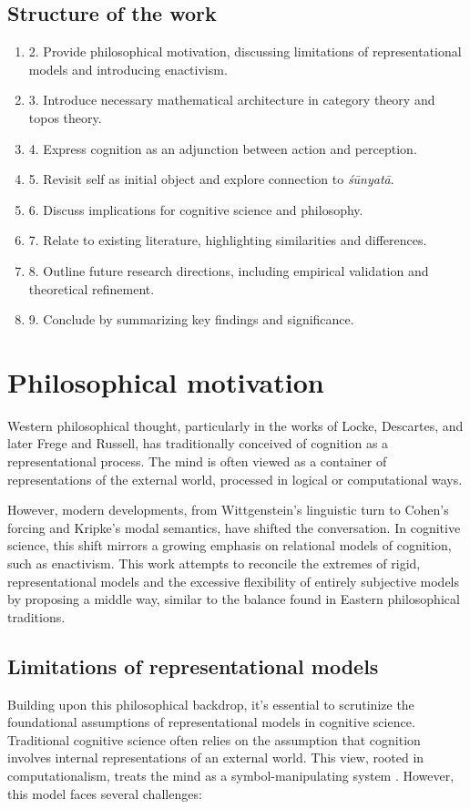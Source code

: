 \documentclass{article}
\begin{document}
\subsection{Structure of the work}
\begin{enumerate}[start=2,label=\S]
    \item 2. Provide philosophical motivation, discussing limitations of representational models and introducing enactivism.
    \item 3. Introduce necessary mathematical architecture in category theory and topos theory.
    \item 4. Express cognition as an adjunction between action and perception.
    \item 5. Revisit self as initial object and explore connection to \emph{śūnyatā}.
    \item 6. Discuss implications for cognitive science and philosophy.
    \item 7. Relate to existing literature, highlighting similarities and differences.
    \item 8. Outline future research directions, including empirical validation and theoretical refinement.
    \item 9. Conclude by summarizing key findings and significance.
\end{enumerate}

\section{Philosophical motivation}
Western philosophical thought, particularly in the works of Locke, Descartes, and later Frege and Russell, has traditionally conceived of cognition as a representational process. The mind is often viewed as a container of representations of the external world, processed in logical or computational ways.

However, modern developments, from Wittgenstein’s linguistic turn to Cohen’s forcing and Kripke’s modal semantics, have shifted the conversation. In cognitive science, this shift mirrors a growing emphasis on relational models of cognition, such as enactivism. This work attempts to reconcile the extremes of rigid, representational models and the excessive flexibility of entirely subjective models by proposing a middle way, similar to the balance found in Eastern philosophical traditions.

\subsection{Limitations of representational models}
Building upon this philosophical backdrop, it's essential to scrutinize the foundational assumptions of representational models in cognitive science. Traditional cognitive science often relies on the assumption that cognition involves internal representations of an external world. This view, rooted in computationalism, treats the mind as a symbol-manipulating system \cite{fodor1980}. However, this model faces several challenges:
\end{document}
